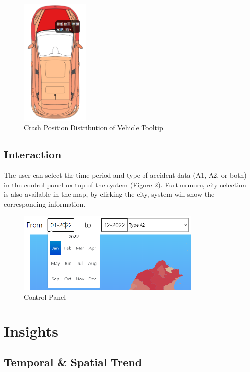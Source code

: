 \documentclass[a4paper, oneside, final, 12pt]{scrartcl} %
\begin{document}
\begin{figure}[htbp]
  \centering
  \includegraphics[width=0.3\textwidth]{"./Image/crash_tooltip.png"}
  \caption{Crash Position Distribution of Vehicle Tooltip}
  \label{fig: crash_tooltip}
\end{figure}

\subsection{Interaction}

The user can select the time period and type of accident data (A1, A2, or both)
in the control panel on top of the system (Figure \ref{fig: control_panel}).
Furthermore, city selection is also available in the map,
by clicking the city, system will show the corresponding information.

\begin{figure}[htbp]
  \centering
  \includegraphics[width=0.8\textwidth]{"./Image/panel.png"}
  \caption{Control Panel}
  \label{fig: control_panel}
\end{figure}

\section{Insights}

\subsection{Temporal \& Spatial Trend}
\end{document}
